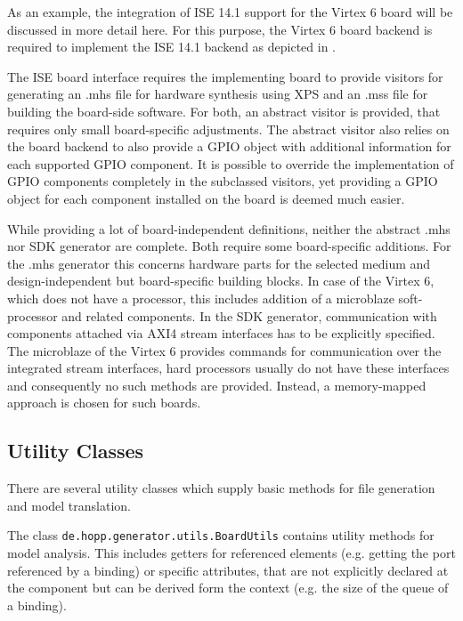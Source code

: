 \documentclass{report}
\begin{document}

As an example, the integration of ISE 14.1 support for the Virtex 6 board will be discussed in more detail here. For this purpose, the Virtex 6 board backend is required to implement the ISE 14.1 backend as depicted in .

The ISE board interface requires the implementing board to provide visitors for generating an .mhs file for hardware synthesis using XPS and an .mss file for building the board-side software. For both, an abstract visitor is provided, that requires only small board-specific adjustments. The abstract visitor also relies on the board backend to also provide a GPIO object with additional information for each supported GPIO component. It is possible to override the implementation of GPIO components completely in the subclassed visitors, yet providing a GPIO object for each component installed on the board is deemed much easier.

While providing a lot of board-independent definitions, neither the abstract .mhs nor SDK generator are complete. Both require some board-specific additions. For the .mhs generator this concerns hardware parts for the selected medium and design-independent but board-specific building blocks. In case of the Virtex 6, which does not have a processor, this includes addition of a microblaze soft-processor and related components. In the SDK generator, communication with components attached via AXI4 stream interfaces has to be explicitly specified. The microblaze of the Virtex 6 provides commands for communication over the integrated stream interfaces, hard processors usually do not have these interfaces and consequently no such methods are provided. Instead, a memory-mapped approach is chosen for such boards.

\subsection{Utility Classes}

There are several utility classes which supply basic methods for file generation and model translation.

The class \texttt{de.hopp.generator.utils.BoardUtils} contains utility methods for model analysis. This includes getters for referenced elements (e.g. getting the port referenced by a binding) or specific attributes, that are not explicitly declared at the component but can be derived form the context (e.g. the size of the queue of a binding).
\end{document}

